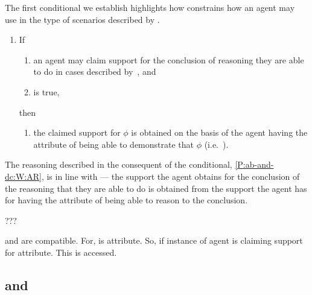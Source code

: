 \begin{note}[Conditional A]
  The first conditional we establish highlights how \uRa{} constrains how an agent may use \gsi{} in the type of scenarios described by \eA{}.

  \begin{proposition}[\mcA{}]
  \begin{enumerate}[label=(C\Alph*), ref=(C\Alph*)]
  \item\label{P:ab-and-dc:W} If
    \begin{enumerate}[label=(\roman*), ref=(CA.\roman*)]
    \item\label{P:ab-and-dc:W:ab} an agent may claim support for the conclusion of reasoning they are able to do in cases described by~\eA{}, and
    \item\label{P:ab-and-dc:W:uRa} \uRa{} is true,
    \end{enumerate}
    then
    \begin{enumerate}[label=(\roman*), ref=(CA.\roman*), resume]
    \item\label{P:ab-and-dc:W:AR} the claimed support for \(\phi\) is obtained on the basis of the agent having the attribute of being able to demonstrate that \(\phi\) (i.e.\ \AR{}).
    \end{enumerate}
  \end{enumerate}
\end{proposition}

  The reasoning described in the consequent of the conditional, \ref{P:ab-and-dc:W:AR}, is in line with \AR{} --- the support the agent obtains for the conclusion of the reasoning that they are able to do is obtained from the support the agent has for having the attribute of being able to reason to the conclusion.
\end{note}

\begin{note}[Summarising]
  ???
\end{note}

\begin{note}
  \AR{} and \uRa{} are compatible.
  For, \AR{} is attribute.
  So, if instance of \AR{} agent is claiming support for attribute.
  This is accessed.
\end{note}

\subsection{\nI{} and \AR{}}
\label{sec:second-conditional}

